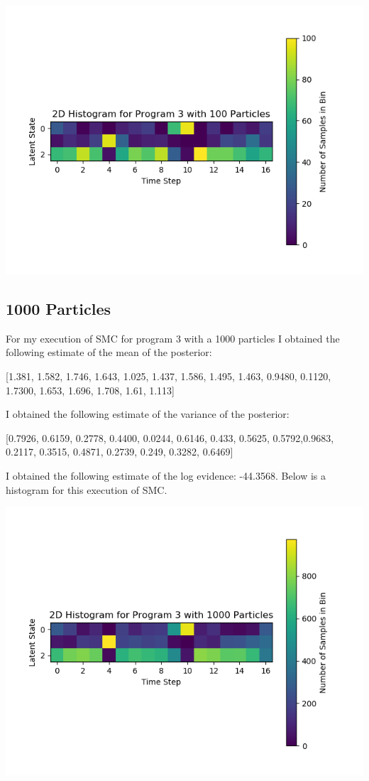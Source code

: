 \documentclass[11pt]{article}
\theoremstyle{definition}
\begin{document}
\begin{center}
\includegraphics[scale=0.5]{../plots/P3NP100.png}
\end{center}

\subsection{1000 Particles}


For my execution of SMC for program 3 with a 1000 particles I obtained the following estimate of the mean of the posterior:

[1.381, 1.582, 1.746, 1.643, 1.025, 1.437, 1.586, 1.495, 1.463, 0.9480, 0.1120, 1.7300, 1.653, 1.696, 1.708, 1.61, 1.113]

I obtained the following estimate of the variance of the posterior:

[0.7926, 0.6159, 0.2778, 0.4400, 0.0244, 0.6146, 0.433, 0.5625, 0.5792,0.9683, 0.2117, 0.3515, 0.4871, 0.2739, 0.249, 0.3282, 0.6469]

I obtained the following estimate of the log evidence: -44.3568. Below is a histogram for this execution of SMC.

\begin{center}
\includegraphics[scale=0.5]{../plots/P3NP1000.png}
\end{center}
\end{document}
